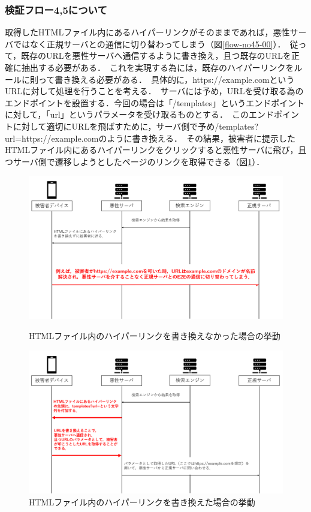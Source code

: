 \documentclass[dvipdfmx]{jsarticle}
\begin{document}
            \subsubsection{検証フロー4,5について}
                取得したHTMLファイル内にあるハイパーリンクがそのままであれば，悪性サーバではなく正規サーバとの通信に切り替わってしまう（図\ref{flow-no45-00}）．\
                従って，既存のURLを悪性サーバへ通信するように書き換え，且つ既存のURLを正確に抽出する必要がある．\
                これを実現する為には，既存のハイパーリンクをルールに則って書き換える必要がある．\
                具体的に，https://example.comというURLに対して処理を行うことを考える．\
                サーバには予め，URLを受け取る為のエンドポイントを設置する．今回の場合は「/templates」というエンドポイントに対して，「url」というパラメータを受け取るものとする．\
                このエンドポイントに対して適切にURLを飛ばすために，サーバ側で予め/templates?url=https://example.comのように書き換える．\
                その結果，被害者に提示したHTMLファイル内にあるハイパーリンクをクリックすると悪性サーバに飛び，且つサーバ側で遷移しようとしたページのリンクを取得できる（図\ref{flow-no45-01}）．
                \begin{figure}[pth]
                    \centering
                    \includegraphics[width=12cm]{img/vc-vf-4-5-00.png}
                    \caption{HTMLファイル内のハイパーリンクを書き換えなかった場合の挙動}
                    \label{flow-no45-00}
                    \includegraphics[width=12cm]{img/vc-vf-4-5-01.png}
                    \caption{HTMLファイル内のハイパーリンクを書き換えた場合の挙動}
                    \label{flow-no45-01}
                \end{figure}
                \clearpage
\end{document}

